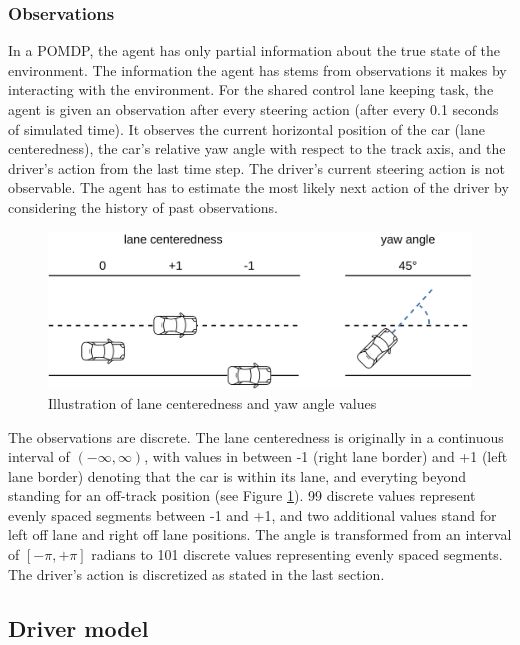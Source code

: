 

\subsubsection{Observations}
\label{sec:observations}

In a POMDP, the agent has only partial information about the true state of the environment. The information the agent has stems from observations it makes by interacting with the environment. For the shared control lane keeping task, the agent is given an observation after every steering action (after every 0.1 seconds of simulated time). It observes the current horizontal position of the car (lane centeredness), the car's relative yaw angle with respect to the track axis, and the driver's action from the last time step. The driver's current steering action is not observable. The agent has to estimate the most likely next action of the driver by considering the history of past observations. 

\begin{figure}[htbp]
    \includegraphics[width=0.6\linewidth]{figures/angle_distance.pdf}
    \centering
    \caption{Illustration of lane centeredness and yaw angle values}
    \label{fig:observations}
\end{figure}

The observations are discrete. The lane centeredness is originally in a continuous interval of $(-\infty,\infty)$, with values in between -1 (right lane border) and +1 (left lane border) denoting that the car is within its lane, and everyting beyond standing for an off-track position (see Figure \ref{fig:observations}). 99 discrete values represent evenly spaced segments between -1 and +1, and two additional values stand for left off lane and right off lane positions. The angle is transformed from an interval of $[-\pi, +\pi]$ radians to 101 discrete values representing evenly spaced segments. The driver's action is discretized as stated in the last section.

\subsection{Driver model}
\label{sec:driver_model}

